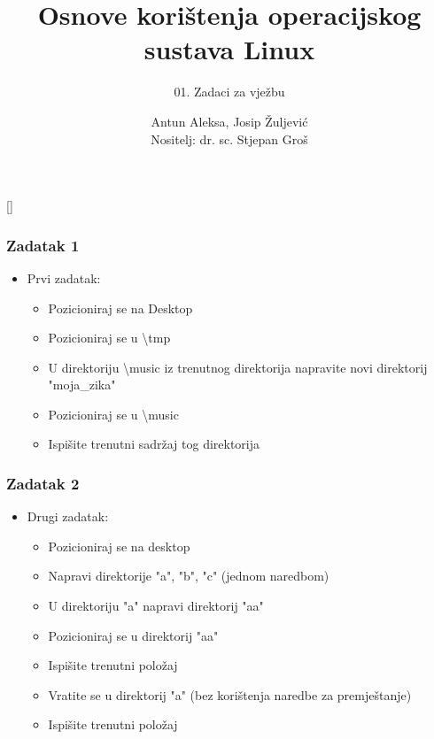 \documentclass{beamer}
\title{Osnove korištenja operacijskog sustava Linux}
\subtitle{01. Zadaci za vježbu}
\author[Antun Aleksa, Josip Žuljević]{Antun Aleksa, Josip Žuljević\\{\small Nositelj: dr. sc. Stjepan Groš}}
\institute[FER]{Sveučilište u Zagrebu \\
				Fakultet elektrotehnike i računarstva}
\date{\todayiso}
\begin{document}
{
[] %

\begin{frame}
\maketitle
\end{frame}
}

\begin{frame}[t]
\frametitle{Zadatak 1}
\begin{itemize}
  \item Prvi zadatak:
  \begin{itemize}
    \item Pozicioniraj se na Desktop
    \item Pozicioniraj se u \textbackslash tmp
    \item U direktoriju \textbackslash music iz trenutnog direktorija napravite novi direktorij "moja\_zika"
	\item Pozicioniraj se u \textbackslash music
	\item Ispišite trenutni sadržaj tog direktorija
  \end{itemize}
\end{itemize}
\end{frame}

\begin{frame}[t]
\frametitle{Zadatak 2}
\begin{itemize}
  \item Drugi zadatak:
  \begin{itemize}
    \item Pozicioniraj se na desktop
    \item Napravi direktorije "a", "b", "c" (jednom naredbom)
    \item U direktoriju "a" napravi direktorij "aa"
	\item Pozicioniraj se u direktorij "aa"
	\item Ispišite trenutni položaj
	\item Vratite se u direktorij "a" (bez korištenja naredbe za premještanje)
	\item Ispišite trenutni položaj
  \end{itemize}
\end{itemize}
\end{frame}
\end{document}
